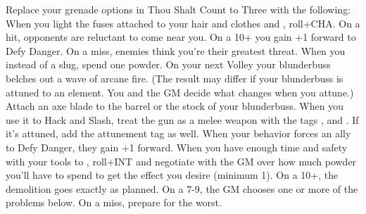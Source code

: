 \documentclass[darkmode]{dw_playbook}
\begin{document}
    {
            {Replace your grenade options in Thou Shalt Count to Three with the following:
            \gapSm
            \gapSm
            \gapSm
            }
        \gap
            {When you light the fuses attached to your hair and clothes and , roll+CHA.  On a hit, opponents are reluctant to come near you.  On a 10+ you gain +1 forward to Defy Danger.  On a miss, enemies think you're their greatest threat.}
        \gap
            {When you  instead of a slug, spend one powder.  On your next Volley your blunderbuss belches out a wave of arcane fire.  (The result may differ if your blunderbuss is attuned to an element.  You and the GM decide what changes when you attune.)}
        \gap
            {Attach an axe blade to the barrel or the stock of your blunderbuss.  When you use it to Hack and Slash, treat the gun as a melee weapon with the tags , and .  If it's attuned, add the attunement tag as well.}
            {When your behavior forces an ally to Defy Danger, they gain +1 forward.}
        \gap
            {When you have enough time and safety with your tools to , roll+INT and negotiate with the GM over how much powder you’ll have to spend to get the effect you desire (minimum 1).  On a 10+, the demolition goes exactly as planned.  On a 7-9, the GM chooses one or more of the problems below.  On a miss, prepare for the worst.
            \gapSm
            \gapSm
}}
\end{document}
